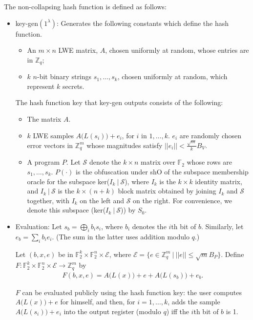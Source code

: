 \documentclass{article}
\begin{document}
The non-collapsing hash function is defined as follows:
\begin{itemize}
    \item \textsf{key-gen}$(1^\lambda)$: Generates the following constants which define the hash function.
    \begin{itemize}
        \item An $m \times n$ LWE matrix, $A$, chosen uniformly at random, whose entries are in $\mathbb{Z}_q$;
        \item $k$ $n$-bit binary strings $s_1, \ldots, s_k$, chosen uniformly at random, which represent $k$ secrets.
    \end{itemize}

    The hash function key that \textsf{key-gen} outputs consists of the following:
    \begin{itemize}
			\item The matrix $A$.
			\item $k$ LWE samples $A\big( L(s_i) \big) + e_i$, for $i$ in $1, \ldots, k$. $e_i$ are randomly chosen error vectors in $\mathbb{Z}_q^m$ whose magnitudes satisfy $||e_i|| < \frac{\sqrt{m}}{k}B_V$.
        \item A program $P$. Let $\mathcal{S}$ denote the $k \times n$ matrix over $\mathbb{F}_2$ whose rows are $s_1, \ldots, s_k$. $P(\cdot)$ is the obfuscation under \textsf{shO} of the subspace membership oracle for the subspace ker($I_k \: | \: \mathcal{S}$), where $I_k$ is the $k \times k$ identity matrix, and $I_k \: | \: \mathcal{S}$ is the $k \times (n+k)$ block matrix obtained by joining $I_k$ and $\mathcal{S}$ together, with $I_k$ on the left and $\mathcal{S}$ on the right. For convenience, we denote this subspace (ker($I_k \: | \: \mathcal{S}$)) by $S_0$.
    \end{itemize}
    \item Evaluation: Let $s_b = \bigoplus_i b_i s_i$, where $b_i$ denotes the $i$th bit of $b$. Similarly, let $e_b = \sum_i b_i e_i$. (The sum in the latter uses addition modulo $q$.)

Let $(b, x, e)$ be in $\mathbb{F}_2^k \times \mathbb{F}_2^n \times \mathcal{E}$, where $\mathcal{E} = \big\{e \in \mathbb{Z}_q^m \: \big| \: ||e|| \leq \sqrt{m}B_P \big\}$. Define $F : \mathbb{F}_2^k \times \mathbb{F}_2^n \times \mathcal{E} \rightarrow \mathbb{Z}_q^m$ by
\begin{align}
F(b, x, e) = A\big( L(x) \big) + e + A\big( L(s_b) \big) + e_b.
\end{align}

$F$ can be evaluated publicly using the hash function key: the user computes $A\big( L(x) \big) + e$ for himself, and then, for $i = 1,\ldots,k$, adds the sample $A\big( L(s_i) \big) + e_i$ into the output register (modulo $q$) iff the $i$th bit of $b$ is 1.
\end{itemize}
\end{document}
